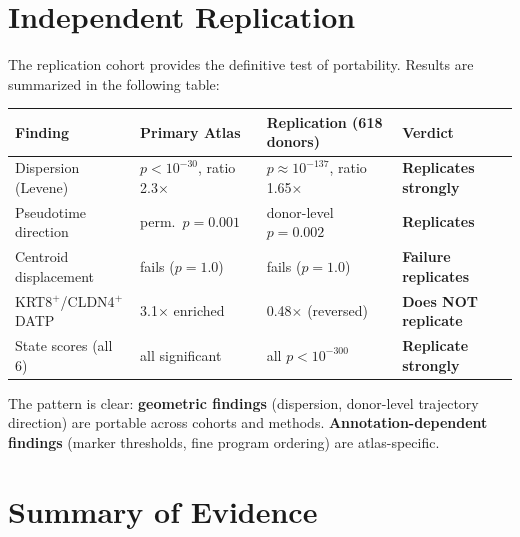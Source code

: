 \documentclass[11pt]{article}
\begin{document}
\section{Independent Replication}

The replication cohort provides the definitive test of portability. Results are summarized in the following table:

\begin{center}
\small
\begin{tabular}{llll}
\toprule
Finding & Primary Atlas & Replication (618 donors) & Verdict \\
\midrule
Dispersion (Levene) & $p < 10^{-30}$, ratio 2.3$\times$ & $p \approx 10^{-137}$, ratio 1.65$\times$ & \textbf{Replicates strongly} \\
Pseudotime direction & perm.\ $p = 0.001$ & donor-level $p = 0.002$ & \textbf{Replicates} \\
Centroid displacement & fails ($p = 1.0$) & fails ($p = 1.0$) & \textbf{Failure replicates} \\
KRT8$^+$/CLDN4$^+$ DATP & 3.1$\times$ enriched & 0.48$\times$ (reversed) & \textbf{Does NOT replicate} \\
State scores (all 6) & all significant & all $p < 10^{-300}$ & \textbf{Replicate strongly} \\
\bottomrule
\end{tabular}
\end{center}

The pattern is clear: \textbf{geometric findings} (dispersion, donor-level trajectory direction) are portable across cohorts and methods. \textbf{Annotation-dependent findings} (marker thresholds, fine program ordering) are atlas-specific.


\section{Summary of Evidence}
\end{document}
